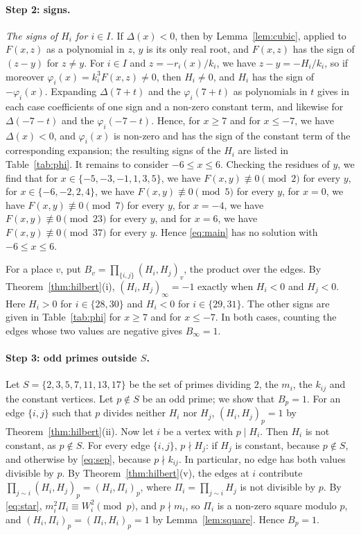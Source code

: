 \documentclass[11pt]{article}
\begin{document}
\paragraph{Step 2: signs.} \emph{The signs of $H_i$ for $i\in I$.} If $\Delta(x)<0$, then by Lemma~\ref{lem:cubic}, applied to $F(x,z)$ as a polynomial in $z$, $y$ is its only real root, and $F(x,z)$ has the sign of $(z-y)$ for $z\neq y$. For $i\in I$ and $z=-r_i(x)/k_i$, we have $z-y=-H_i/k_i$, so if moreover $\varphi_i(x)=k_i^3F(x,z)\neq0$, then $H_i\neq0$, and $H_i$ has the sign of $-\varphi_i(x)$. Expanding $\Delta(7+t)$ and the $\varphi_i(7+t)$ as polynomials in $t$ gives in each case coefficients of one sign and a non-zero constant term, and likewise for $\Delta(-7-t)$ and the $\varphi_i(-7-t)$. Hence, for $x\geq7$ and for $x\leq-7$, we have $\Delta(x)<0$, and $\varphi_i(x)$ is non-zero and has the sign of the constant term of the corresponding expansion; the resulting signs of the $H_i$ are listed in Table~\ref{tab:phi}. It remains to consider $-6\leq x\leq6$. Checking the residues of $y$, we find that for $x\in\{-5,\allowbreak -3,\allowbreak -1,\allowbreak 1,\allowbreak 3,\allowbreak 5\}$, we have $F(x,y)\not\equiv0\pmod{2}$ for every $y$, for $x\in\{-6,\allowbreak -2,\allowbreak 2,\allowbreak 4\}$, we have $F(x,y)\not\equiv0\pmod{5}$ for every $y$, for $x=0$, we have $F(x,y)\not\equiv0\pmod{7}$ for every $y$, for $x=-4$, we have $F(x,y)\not\equiv0\pmod{23}$ for every $y$, and for $x=6$, we have $F(x,y)\not\equiv0\pmod{37}$ for every $y$. Hence \eqref{eq:main} has no solution with $-6\leq x\leq6$.

For a place $v$, put $B_v=\prod_{\{i,j\}}(H_i,H_j)_v$, the product over the edges. By Theorem~\ref{thm:hilbert}(i), $(H_i,H_j)_\infty=-1$ exactly when $H_i<0$ and $H_j<0$. Here $H_i>0$ for $i\in\{28,\allowbreak 30\}$ and $H_i<0$ for $i\in\{29,\allowbreak 31\}$. The other signs are given in Table~\ref{tab:phi} for $x\geq7$ and for $x\leq-7$. In both cases, counting the edges whose two values are negative gives $B_\infty=1$.

\paragraph{Step 3: odd primes outside $S$.} Let $S=\{2,3,5,7,11,13,17\}$ be the set of primes dividing $2$, the $m_{i}$, the $k_{ij}$ and the constant vertices. Let $p\notin S$ be an odd prime; we show that $B_p=1$. For an edge $\{i,j\}$ such that $p$ divides neither $H_i$ nor $H_j$, $(H_i,H_j)_p=1$ by Theorem~\ref{thm:hilbert}(ii). Now let $i$ be a vertex with $p\mid H_i$. Then $H_i$ is not constant, as $p\notin S$. For every edge $\{i,j\}$, $p\nmid H_j$: if $H_j$ is constant, because $p\notin S$, and otherwise by \eqref{eq:sep}, because $p\nmid k_{ij}$. In particular, no edge has both values divisible by $p$. By Theorem~\ref{thm:hilbert}(v), the edges at $i$ contribute $\prod_{j\sim i}(H_i,H_j)_p=(H_i,\Pi_i)_p$, where $\Pi_i=\prod_{j\sim i}H_j$ is not divisible by $p$. By \eqref{eq:star}, $m_i^2\Pi_i\equiv W_i^2\pmod p$, and $p\nmid m_i$, so $\Pi_i$ is a non-zero square modulo $p$, and $(H_i,\Pi_i)_p=(\Pi_i,H_i)_p=1$ by Lemma~\ref{lem:square}. Hence $B_p=1$.
\end{document}
